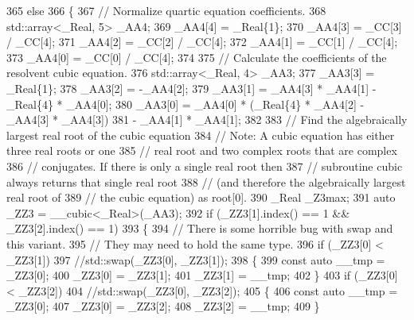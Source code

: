\begin{DoxyCode}
365       \textcolor{keywordflow}{else}
366         \{
367           \textcolor{comment}{// Normalize quartic equation coefficients.}
368           std::array<\_Real, 5> \_AA4;
369           \_AA4[4] = \_Real\{1\};
370           \_AA4[3] = \_CC[3] / \_CC[4];
371           \_AA4[2] = \_CC[2] / \_CC[4];
372           \_AA4[1] = \_CC[1] / \_CC[4];
373           \_AA4[0] = \_CC[0] / \_CC[4];
374 
375           \textcolor{comment}{// Calculate the coefficients of the resolvent cubic equation.}
376           std::array<\_Real, 4> \_AA3;
377           \_AA3[3] = \_Real\{1\};
378           \_AA3[2] = -\_AA4[2];
379           \_AA3[1] = \_AA4[3] * \_AA4[1] - \_Real\{4\} * \_AA4[0];
380           \_AA3[0] = \_AA4[0] * (\_Real\{4\} * \_AA4[2] - \_AA4[3] * \_AA4[3])
381                   - \_AA4[1] * \_AA4[1];
382 
383           \textcolor{comment}{// Find the algebraically largest real root of the cubic equation}
384           \textcolor{comment}{// Note: A cubic equation has either three real roots or one}
385           \textcolor{comment}{//       real root and two complex roots that are complex}
386           \textcolor{comment}{//       conjugates. If there is only a single real root then}
387           \textcolor{comment}{//       subroutine cubic always returns that single real root}
388           \textcolor{comment}{//       (and therefore the algebraically largest real root of}
389           \textcolor{comment}{//       the cubic equation) as root[0].}
390           \_Real \_Z3max;
391           \textcolor{keyword}{auto} \_ZZ3 = \_\_cubic<\_Real>(\_AA3);
392           \textcolor{keywordflow}{if} (\_ZZ3[1].index() == 1 && \_ZZ3[2].index() == 1)
393             \{
394               \textcolor{comment}{// There is some horrible bug with swap and this variant.}
395               \textcolor{comment}{// They may need to hold the same type.}
396               \textcolor{keywordflow}{if} (\_ZZ3[0] < \_ZZ3[1])
397                 \textcolor{comment}{//std::swap(\_ZZ3[0], \_ZZ3[1]);}
398                 \{
399                   \textcolor{keyword}{const} \textcolor{keyword}{auto} \_\_tmp = \_ZZ3[0];
400                   \_ZZ3[0] = \_ZZ3[1];
401                   \_ZZ3[1] = \_\_tmp;
402                 \}
403               \textcolor{keywordflow}{if} (\_ZZ3[0] < \_ZZ3[2])
404                 \textcolor{comment}{//std::swap(\_ZZ3[0], \_ZZ3[2]);}
405                 \{
406                   \textcolor{keyword}{const} \textcolor{keyword}{auto} \_\_tmp = \_ZZ3[0];
407                   \_ZZ3[0] = \_ZZ3[2];
408                   \_ZZ3[2] = \_\_tmp;
409                 \}

\end{DoxyCode}
